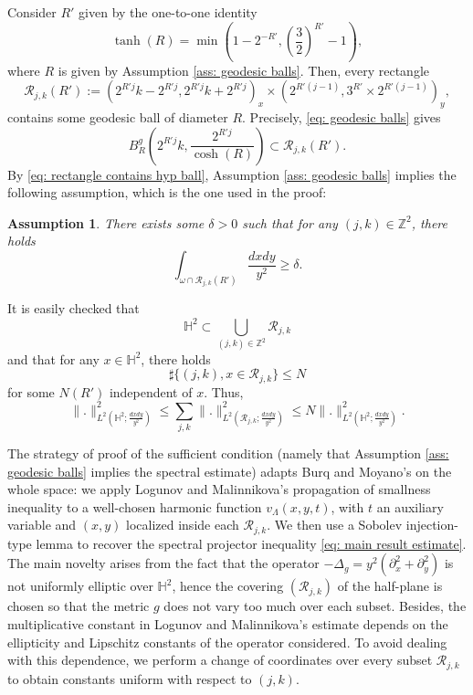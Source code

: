 \documentclass[letterpaper,11pt]{amsart}
\theoremstyle{note}
\newtheorem{assumption}{Assumption}
\numberwithin{equation}{section}
\newenvironment{rem}{{\noindent\bf Remark }}{}
\begin{document}
\begin{rem}
Consider $R'$ given by the one-to-one identity $$\tanh(R) = \min\left(1-2^{-R'}, \left(\frac{3}{2}\right)^{R'} - 1\right),$$ where $R$ is given by Assumption \ref{ass: geodesic balls}. Then, every rectangle $$\mathcal{R}_{j,k}(R'):= (2^{R'j} k - 2^{R'j}, 2^{R'j}k + 2^{R'j})_x \times (2^{R'(j-1)}, 3^{R'} \times 2^{R'(j-1)})_y,$$ contains some geodesic ball of diameter $R$. Precisely, \eqref{eq: geodesic balls} gives \begin{equation} \label{eq: rectangle contains hyp ball}
    B^g_R\left(2^{R'j}k, \frac{2^{R'j}}{\cosh(R)}\right) \subset \mathcal{R}_{j,k}(R').
\end{equation}
\end{rem} By \eqref{eq: rectangle contains hyp ball}, Assumption \ref{ass: geodesic balls} implies the following assumption, which is the one used in the proof:

\begin{assumption}
    \label{ass: Cjk}
    There exists some $\delta > 0$ such that for any $(j,k) \in \mathbb{Z}^2$, there holds $$\int_{\omega \cap \mathcal{R}_{j,k}(R')} \frac{dxdy}{y^2} \geq \delta.$$
\end{assumption}

It is easily checked that \begin{equation}\label{eq: covering} \mathbb{H}^2 \subset \bigcup_{(j,k) \in \mathbb{Z}^2} \mathcal{R}_{j,k}\end{equation} and that for any $x \in \mathbb{H}^2$, there holds $$\sharp \{(j,k), x \in \mathcal{R}_{j,k}\} \leq N$$ for some $N(R')$ independent of $x$. Thus, \begin{equation}
    \label{eq: equivalence of norms}
    \|.\|_{L^2(\mathbb{H}^2; \frac{dxdy}{y^2})}^2 \leq \sum_{j,k} \|.\|_{L^2(\mathcal{R}_{j,k}; \frac{dxdy}{y^2})}^2 \leq N \|.\|_{L^2(\mathbb{H}^2; \frac{dxdy}{y^2})}^2.
\end{equation}

The strategy of proof of the sufficient condition (namely that Assumption \ref{ass: geodesic balls} implies the spectral estimate) adapts Burq and Moyano's \cite{burqmoyano2023propagationheat} on the whole space: we apply Logunov and Malinnikova's propagation of smallness inequality to a well-chosen harmonic function $v_\Lambda(x,y,t)$, with $t$ an auxiliary variable and $(x,y)$ localized inside each $\mathcal{R}_{j,k}$. We then use a Sobolev injection-type lemma to recover the spectral projector inequality \eqref{eq: main result estimate}. The main novelty arises from the fact that the operator $-\Delta_g = y^2(\partial_x^2 + \partial_y^2)$ is not uniformly elliptic over $\mathbb{H}^2$, hence the covering $(\mathcal{R}_{j,k})$ of the half-plane is chosen so that the metric $g$ does not vary too much over each subset. Besides, the multiplicative constant in Logunov and Malinnikova's estimate depends on the ellipticity and Lipschitz constants of the operator considered. To avoid dealing with this dependence, we perform a change of coordinates over every subset $\mathcal{R}_{j,k}$ to obtain constants uniform with respect to $(j,k)$.
\end{document}
